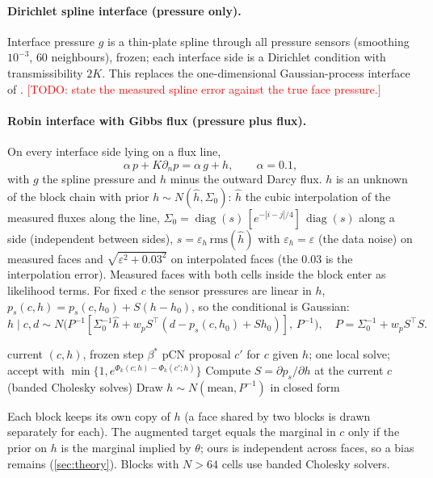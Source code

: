 \documentclass[11pt]{article}
\newcommand{\todo}[1]{\textcolor{red}{[TODO: #1]}}
\begin{document}
\paragraph{Dirichlet spline interface (pressure only).} Interface pressure $g$ is a thin-plate spline through all pressure sensors (smoothing $10^{-3}$, $60$ neighbours), frozen; each interface side is a Dirichlet condition with transmissibility $2K$. This replaces the one-dimensional Gaussian-process interface of \citet{XuLiaoLi2022}. \todo{state the measured spline error against the true face pressure.}

\paragraph{Robin interface with Gibbs flux (pressure plus flux).} On every interface side lying on a flux line,
\begin{equation}
\alpha\,p+K\partial_np=\alpha\,g+h,\qquad \alpha=0.1,
\end{equation}
with $g$ the spline pressure and $h$ minus the outward Darcy flux. $h$ is an unknown of the block chain with prior $h\sim N(\hat h,\Sigma_0)$: $\hat h$ the cubic interpolation of the measured fluxes along the line, $\Sigma_0=\operatorname{diag}(s)\,[e^{-|i-j|/4}]\,\operatorname{diag}(s)$ along a side (independent between sides), $s=\varepsilon_h\,\mathrm{rms}(\hat h)$ with $\varepsilon_h=\varepsilon$ (the data noise) on measured faces and $\sqrt{\varepsilon^2+0.03^2}$ on interpolated faces (the $0.03$ is the interpolation error). Measured faces with both cells inside the block enter as likelihood terms. For fixed $c$ the sensor pressures are linear in $h$, $p_s(c,h)=p_s(c,h_0)+S(h-h_0)$, so the conditional is Gaussian:
\begin{equation}
h\mid c,d\sim N\bigl(P^{-1}[\Sigma_0^{-1}\hat h+w_pS^\top(d-p_s(c,h_0)+Sh_0)],\,P^{-1}\bigr),\quad P=\Sigma_0^{-1}+w_pS^\top S.
\end{equation}
\begin{algorithm}[h]
\caption{One iteration of a block chain with Robin interface and Gibbs flux}\label{alg:gibbs}
\begin{algorithmic}[1]
\Require current $(c,h)$, frozen step $\beta^\ast$
\State pCN proposal $c'$ for $c$ given $h$; one local solve; accept with $\min\{1,e^{\Phi_k(c;h)-\Phi_k(c';h)}\}$
\State Compute $S=\partial p_s/\partial h$ at the current $c$ (banded Cholesky solves)
\State Draw $h\sim N(\text{mean},P^{-1})$ in closed form
\end{algorithmic}
\end{algorithm}
Each block keeps its own copy of $h$ (a face shared by two blocks is drawn separately for each). The augmented target equals the marginal in $c$ only if the prior on $h$ is the marginal implied by $\theta$; ours is independent across faces, so a bias remains (\cref{sec:theory}). Blocks with $N>64$ cells use banded Cholesky solvers.
\end{document}
